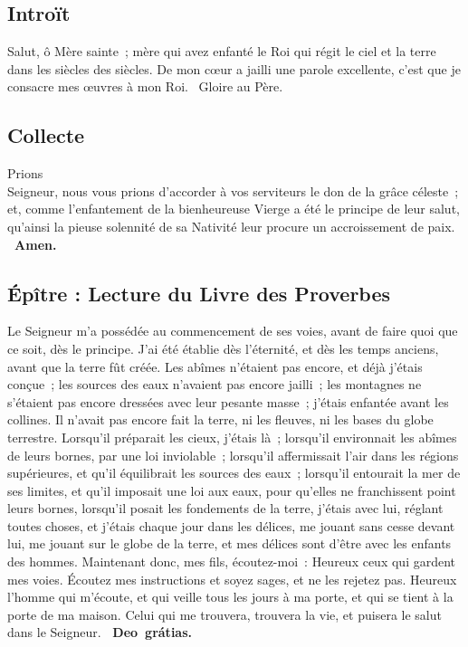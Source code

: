 \begin{multicols}{2}
\subsection*{Introït}
Salut, ô Mère sainte ; mère qui avez enfanté le Roi qui régit le ciel et la terre dans les siècles des siècles.
De mon cœur a jailli une parole excellente, c’est que je consacre mes œuvres à mon Roi.
\vb\ Gloire au Père.

\subsection*{Collecte}
Prions\\
Seigneur, nous vous prions d’accorder à vos serviteurs le don de la grâce céleste ; et, comme l’enfantement de la bienheureuse Vierge a été le principe de leur salut, qu’ainsi la pieuse solennité de sa Nativité leur procure un accroissement de paix.
{\textbf {\rb\ Amen.}}

\subsection*{Épître : Lecture du Livre des Proverbes}
Le Seigneur m’a possédée au commencement de ses voies, avant de faire quoi que ce soit, dès le principe. J’ai été établie dès l’éternité, et dès les temps anciens, avant que la terre fût créée. Les abîmes n’étaient pas encore, et déjà j’étais conçue ; les sources des eaux n’avaient pas encore jailli ; les montagnes ne s’étaient pas encore dressées avec leur pesante masse ; j’étais enfantée avant les collines. Il n’avait pas encore fait la terre, ni les fleuves, ni les bases du globe terrestre. Lorsqu’il préparait les cieux, j’étais là ; lorsqu’il environnait les abîmes de leurs bornes, par une loi inviolable ; lorsqu’il affermissait l’air dans les régions supérieures, et qu’il équilibrait les sources des eaux ; lorsqu’il entourait la mer de ses limites, et qu’il imposait une loi aux eaux, pour qu’elles ne franchissent point leurs bornes, lorsqu’il posait les fondements de la terre, j’étais avec lui, réglant toutes choses, et j’étais chaque jour dans les délices, me jouant sans cesse devant lui, me jouant sur le globe de la terre, et mes délices sont d’être avec les enfants des hommes. Maintenant donc, mes fils, écoutez-moi : Heureux ceux qui gardent mes voies. Écoutez mes instructions et soyez sages, et ne les rejetez pas. Heureux l’homme qui m’écoute, et qui veille tous les jours à ma porte, et qui se tient à la porte de ma maison. Celui qui me trouvera, trouvera la vie, et puisera le salut dans le Seigneur.
\textbf{\rb\ Deo grátias.}


\end{multicols}
